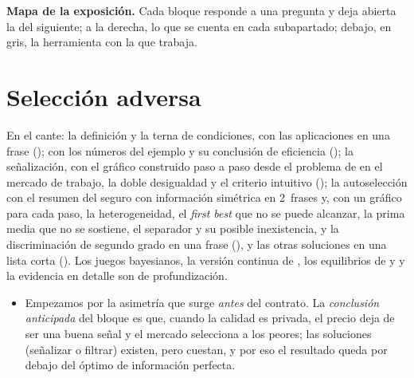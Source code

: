 \documentclass[11pt]{article}
\begin{document}
\begin{anotaciones}
\textbf{Mapa de la exposición.} Cada bloque responde a una pregunta y deja abierta la del siguiente; a la derecha, lo que se cuenta en cada subapartado; debajo, en gris, la herramienta con la que trabaja.
\begin{infografiacaja}
\caption{Mapa del tema: la pregunta de cada bloque, sus subapartados y el hilo que los une}\label{figu:mapa-tema}
\end{infografiacaja}
\end{anotaciones}



\section{Selección adversa}\label{sec:seleccion-adversa}

\begin{notaopositor}
En el cante: la definición y la terna de condiciones, con las aplicaciones en una frase ();  con los números del ejemplo y su conclusión de eficiencia (); la señalización, con el gráfico construido paso a paso desde el problema de  en el mercado de trabajo, la doble desigualdad y el criterio intuitivo (); la autoselección con el resumen del seguro con información simétrica en 2~frases y, con un gráfico para cada paso, la heterogeneidad, el \emph{first best} que no se puede alcanzar, la prima media que no se sostiene, el separador y su posible inexistencia, y la discriminación de segundo grado en una frase (), y las otras soluciones en una lista corta (). Los juegos bayesianos, la versión continua de , los equilibrios de  y  y la evidencia en detalle son de profundización.
\end{notaopositor}

\begin{itemize}
\item Empezamos por la asimetría que surge \emph{antes} del contrato. La \emph{conclusión anticipada} del bloque es que, cuando la calidad es privada, el precio deja de ser una buena señal y el mercado selecciona a los peores; las soluciones (señalizar o filtrar) existen, pero cuestan, y por eso el resultado queda por debajo del óptimo de información perfecta.
\end{itemize}
\end{document}
